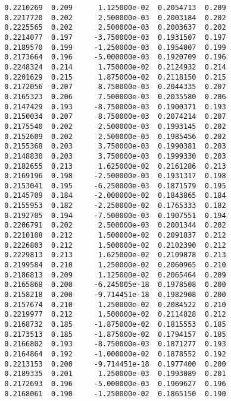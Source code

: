 \documentclass[
  letterpaper,
  DIV=11,
  numbers=noendperiod]{scrartcl}
\begin{document}
\begin{verbatim}
  0.2210269  0.209      1.125000e-02  0.2054713  0.209           
  0.2217720  0.202      2.500000e-03  0.2003184  0.202           
  0.2225565  0.202      2.500000e-03  0.2003637  0.202           
  0.2214077  0.197     -3.750000e-03  0.1931507  0.197           
  0.2189570  0.199     -1.250000e-03  0.1954007  0.199           
  0.2173664  0.196     -5.000000e-03  0.1920709  0.196           
  0.2248324  0.214      1.750000e-02  0.2124932  0.214           
  0.2201629  0.215      1.875000e-02  0.2118150  0.215           
  0.2172056  0.207      8.750000e-03  0.2044335  0.207           
  0.2165323  0.206      7.500000e-03  0.2035580  0.206           
  0.2147429  0.193     -8.750000e-03  0.1900371  0.193           
  0.2150034  0.207      8.750000e-03  0.2074214  0.207           
  0.2175540  0.202      2.500000e-03  0.1993145  0.202           
  0.2152609  0.202      2.500000e-03  0.1985456  0.202           
  0.2155368  0.203      3.750000e-03  0.1990381  0.203           
  0.2148830  0.203      3.750000e-03  0.1999330  0.203           
  0.2182655  0.213      1.625000e-02  0.2161286  0.213           
  0.2169196  0.198     -2.500000e-03  0.1931317  0.198           
  0.2153041  0.195     -6.250000e-03  0.1871579  0.195           
  0.2145709  0.184     -2.000000e-02  0.1843865  0.184           
  0.2155953  0.182     -2.250000e-02  0.1765333  0.182           
  0.2192705  0.194     -7.500000e-03  0.1907551  0.194           
  0.2206791  0.202      2.500000e-03  0.2001344  0.202           
  0.2210108  0.212      1.500000e-02  0.2091837  0.212           
  0.2226803  0.212      1.500000e-02  0.2102390  0.212           
  0.2229813  0.213      1.625000e-02  0.2109878  0.213           
  0.2199584  0.210      1.250000e-02  0.2060965  0.210           
  0.2186813  0.209      1.125000e-02  0.2065464  0.209           
  0.2165868  0.200     -6.245005e-18  0.1978508  0.200           
  0.2158218  0.200     -9.714451e-18  0.1982908  0.200           
  0.2157674  0.210      1.250000e-02  0.2084522  0.210           
  0.2219977  0.212      1.500000e-02  0.2114828  0.212           
  0.2168732  0.185     -1.875000e-02  0.1815553  0.185           
  0.2173513  0.185     -1.875000e-02  0.1794157  0.185           
  0.2166802  0.193     -8.750000e-03  0.1871277  0.193           
  0.2164864  0.192     -1.000000e-02  0.1878552  0.192           
  0.2213153  0.200     -9.714451e-18  0.1977400  0.200           
  0.2189335  0.201      1.250000e-03  0.1993089  0.201           
  0.2172693  0.196     -5.000000e-03  0.1969627  0.196           
  0.2168061  0.190     -1.250000e-02  0.1865150  0.190           

\end{verbatim}
\end{document}
